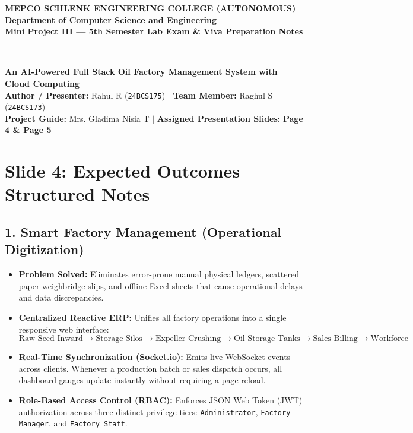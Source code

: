 \documentclass[11pt,a4paper]{article}
\begin{document}
\begin{center}
    {\LARGE \textbf{\color{primary} MEPCO SCHLENK ENGINEERING COLLEGE (AUTONOMOUS)}}\\[3pt]
    {\large \textbf{Department of Computer Science and Engineering}}\\[2pt]
    {\small \textbf{Mini Project III --- 5th Semester Lab Exam \& Viva Preparation Notes}}\\[6pt]
    \rule{\linewidth}{1.2pt}\\[6pt]
    {\Large \textbf{\color{secondary} An AI-Powered Full Stack Oil Factory Management System with Cloud Computing}}\\[4pt]
    \textbf{Author / Presenter:} Rahul R (\texttt{24BCS175}) \quad$|$ \quad \textbf{Team Member:} Raghul S (\texttt{24BCS173})\\[2pt]
    \textbf{Project Guide:} Mrs. Gladima Nisia T \quad$|$ \quad \textbf{Assigned Presentation Slides:} \textbf{Page 4 \& Page 5}
\end{center}

\vspace{0.2cm}

\section{Slide 4: Expected Outcomes --- Structured Notes}

\subsection{1. Smart Factory Management (Operational Digitization)}
\begin{itemize}[leftmargin=1.5em]
    \item \textbf{Problem Solved:} Eliminates error-prone manual physical ledgers, scattered paper weighbridge slips, and offline Excel sheets that cause operational delays and data discrepancies.
    \item \textbf{Centralized Reactive ERP:} Unifies all factory operations into a single responsive web interface:
    \[
    \text{Raw Seed Inward} \longrightarrow \text{Storage Silos} \longrightarrow \text{Expeller Crushing} \longrightarrow \text{Oil Storage Tanks} \longrightarrow \text{Sales Billing} \longrightarrow \text{Workforce}
    \]
    \item \textbf{Real-Time Synchronization (Socket.io):} Emits live WebSocket events across clients. Whenever a production batch or sales dispatch occurs, all dashboard gauges update instantly without requiring a page reload.
    \item \textbf{Role-Based Access Control (RBAC):} Enforces JSON Web Token (JWT) authorization across three distinct privilege tiers: \texttt{Administrator}, \texttt{Factory Manager}, and \texttt{Factory Staff}.
\end{itemize}
\end{document}
